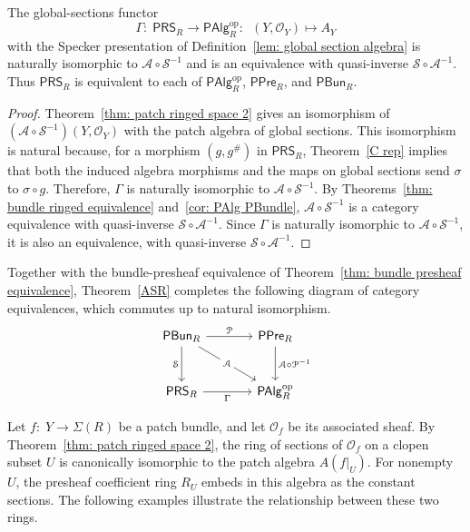 \documentclass[11pt]{amsart}
\def\O{{\mathcal{O}}}
\begin{document}
\begin{theorem} \label{ASR}
The global-sections functor 
$$\Gamma\colon\; \mathsf{PRS}_R\longrightarrow \mathsf{PAlg}_R^{\mathrm{op}}\colon\; \:(Y,\mathcal O_Y)\longmapsto A_Y$$
with the Specker presentation of  Definition~\ref{lem: global section algebra} is naturally isomorphic to $\mathcal A\circ\mathcal S^{-1}$ and is an equivalence with quasi-inverse $\mathcal S\circ\mathcal A^{-1}$. Thus $\mathsf{PRS}_R$ is equivalent to each of $\mathsf{PAlg}_R^{\mathrm{op}}$, $\mathsf{PPre}_R$, and $\mathsf{PBun}_R$.
\end{theorem}
\begin{proof}
Theorem~\ref{thm: patch ringed space 2} gives an isomorphism of  $(\mathcal A\circ\mathcal S^{-1})(Y,\mathcal O_Y)$ with the patch algebra of global sections. This isomorphism is natural because, for a morphism $(g,g^\#)$ in $\mathsf{PRS}_R$, Theorem~\ref{C rep} implies that both the induced algebra morphisms and the maps on global sections send $\sigma$ to $\sigma\circ g$.
Therefore, $\Gamma$ is naturally isomorphic to $\mathcal A\circ\mathcal S^{-1}$. By Theorems~\ref{thm: bundle ringed equivalence} and~\ref{cor: PAlg PBundle}, $\mathcal A\circ\mathcal S^{-1}$ is a category equivalence with quasi-inverse $\mathcal S\circ\mathcal A^{-1}$. Since $\Gamma$ is naturally isomorphic to $\mathcal A\circ\mathcal S^{-1}$, it is also an equivalence, with quasi-inverse $\mathcal S\circ\mathcal A^{-1}$.
\end{proof}


Together with the bundle-presheaf equivalence of Theorem~\ref{thm: bundle presheaf equivalence}, Theorem~\ref{ASR} completes the following diagram of category equivalences, which commutes up to natural isomorphism.
$$
\begin{tikzcd}[column sep=large,row sep=large]
\mathsf{PBun}_R
 \arrow[r,"\mathcal P"]
 \arrow[d,"\mathcal S"']
 \arrow[dr,"\mathcal A"{description}]
&
\mathsf{PPre}_R
 \arrow[d,"\mathcal A\circ\mathcal P^{-1}"]
\\
\mathsf{PRS}_R
 \arrow[r,"\Gamma"']
&
\mathsf{PAlg}_R^{\mathrm{op}}
\end{tikzcd}
$$


 Let $f\colon\; Y\to\Sigma(R)$ be a patch bundle, and let $\mathcal O_f$ be its associated sheaf. By Theorem~\ref{thm: patch ringed space 2}, the ring of sections of $\O_f$ on a clopen subset $U$ is canonically isomorphic to the patch algebra $A(f|_U)$. For nonempty $U$, 
 the presheaf coefficient ring $R_{U}$ embeds in this algebra as the constant sections. The following examples illustrate the relationship between these two rings.
\end{document}
